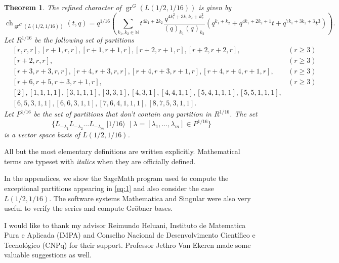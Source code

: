 \documentclass[a4paper, 12pt, reqno]{amsart}
\newtheorem{theorem}{Theorem}[section]
\theoremstyle{remark}
\DeclareMathOperator{\gr}{gr}
\DeclareMathOperator{\ch}{ch}
\DeclareMathOperator{\vacsixteen}{|1/16\rangle}
\begin{document}
\begin{theorem}
  \label{thr:5}
  The refined character of $\gr^G(L(1/2, 1/16))$ is given by
  \begin{equation*}
    \ch_{\gr^G(L(1/2, 1/16))}(t, q) = q^{1/16}\left(\sum_{k_1, k_2 \in \mathbb{N}}t^{4k_1 + 2k_2}\frac{q^{4k_1^2 + 3k_1k_2 + k_2^2}}{(q)_{k_1}(q)_{k_2}}(q^{k_1 + k_2} + q^{4k_1 + 2k_2 + 1}t + q^{7k_1 + 3k_2 + 3}t^3)\right).
  \end{equation*}
  Let $R^{1/16}$ be the following set of partitions
  \begin{equation}
    \label{eq:2}
    \begin{aligned}
    &[r, r, r], [r + 1, r, r], [r + 1, r + 1, r], [r + 2, r + 1, r], [r + 2, r + 2, r], &(r \ge 3) \\
    &[r + 2, r, r], &(r \ge 3) \\
    &[r + 3, r + 3, r, r], [r + 4, r + 3, r, r],  [r + 4, r + 3, r + 1, r], [r + 4, r + 4, r + 1, r], &(r \ge 3)\\
    &[r + 6, r + 5, r + 3, r + 1, r], &(r \ge 3) \\
    &[2], [1, 1, 1, 1], [3, 1, 1, 1], [3, 3, 1], [4, 3, 1], [4, 4, 1, 1], [5, 4, 1, 1, 1], [5, 5, 1, 1, 1], \\
    &[6, 5, 3, 1, 1], [6, 6, 3, 1, 1], [7, 6, 4, 1, 1, 1], [8, 7, 5, 3, 1, 1].
    \end{aligned}
  \end{equation}
  Let $P^{1/16}$ be the set of partitions that don't contain any partition in $R^{1/16}$.
  The set
  \begin{equation*}
    \{L_{-\lambda_1}L_{-\lambda_2}\dots L_{-\lambda_m}\vacsixteen \mid \lambda = [\lambda_1, \dots, \lambda_m] \in P^{1/16}\}
  \end{equation*}
  is a vector space basis of $L(1/2, 1/16)$.
\end{theorem}

All but the most elementary definitions are written explicitly.
Mathematical terms are typeset with \emph{italics} when they are officially defined.

In the appendices, we show the SageMath \cite{sagemath} program used to compute the exceptional partitions appearing in \eqref{eq:1} and also consider the case $L(1/2, 1/16)$.
The software systems Mathematica \cite{Mathematica} and Singular \cite{Singular} were also very useful to verify the series and compute Gr\"{o}bner bases.

I would like to thank my advisor Reimundo Heluani, Instituto de Matematica Pura e Aplicada (IMPA) and Conselho Nacional de Desenvolvimento Científico e Tecnológico (CNPq) for their support.
Professor Jethro Van Ekeren made some valuable suggestions as well.
\end{document}
